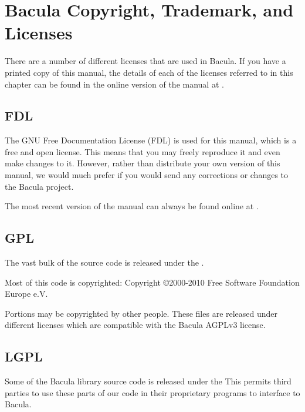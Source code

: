 
\chapter{Bacula Copyright, Trademark, and Licenses}
\label{LicenseChapter}

There are a number of different licenses that are used in Bacula. 
If you have a printed copy of this manual, the details of each of
the licenses referred to in this chapter can be found in the
online version of the manual at
.

\section{FDL}

The GNU Free Documentation License (FDL) is used for this manual,
which is a free and open license. This means that you may freely   
reproduce it and even make changes to it. However, rather than
distribute your own version of this manual, we would much prefer
if you would send any corrections or changes to the Bacula project.
 
The most recent version of the manual can always be found online
at .

\section{GPL}

The vast bulk of the source code is released under the 
.

Most of this code is copyrighted: Copyright \copyright 2000-2010
Free Software Foundation Europe e.V.

Portions may be copyrighted by other people.  These files are released
under different licenses which are compatible with the Bacula AGPLv3 license.

\section{LGPL}

Some of the Bacula library source code is released under the 
 This
permits third parties to use these parts of our code in their proprietary
programs to interface to Bacula. 


